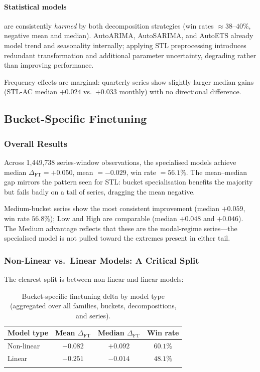 \documentclass[pdflatex,sn-mathphys-num]{sn-jnl}
\theoremstyle{thmstyleone}
\theoremstyle{thmstyletwo}
\theoremstyle{thmstylethree}
\begin{document}
\paragraph{Statistical models} are consistently \emph{harmed} by both
decomposition strategies (win rates $\approx 38$--$40\%$, negative mean and
median).
AutoARIMA, AutoSARIMA, and AutoETS already model trend and seasonality
internally; applying STL preprocessing introduces redundant transformation and
additional parameter uncertainty, degrading rather than improving performance.

Frequency effects are marginal: quarterly series show slightly larger median
gains (STL-AC median $+0.024$ vs.\ $+0.033$ monthly) with no directional
difference.

\subsection{Bucket-Specific Finetuning}\label{sec:ft_results}

\subsubsection{Overall Results}\label{sec:ft_overall}

Across 1{,}449{,}738 series-window observations, the specialised models achieve
median $\Delta_{\mathrm{FT}} = +0.050$, mean $= -0.029$, win rate $= 56.1\%$.
The mean--median gap mirrors the pattern seen for STL: bucket specialisation
benefits the majority but fails badly on a tail of series, dragging the mean
negative.

Medium-bucket series show the most consistent improvement (median $+0.059$,
win rate $56.8\%$); Low and High are comparable (median $+0.048$ and $+0.046$).
The Medium advantage reflects that these are the modal-regime series---the
specialised model is not pulled toward the extremes present in either tail.

\subsubsection{Non-Linear vs.\ Linear Models: A Critical Split}\label{sec:linvnonlin}

The clearest split is between non-linear and linear models:

\begin{table}[ht]
\caption{Bucket-specific finetuning delta by model type (aggregated over all
families, buckets, decompositions, and series).}\label{tab:lin_nonlin}
\begin{tabular}{lccc}
\toprule
Model type & Mean $\Delta_{\mathrm{FT}}$ & Median $\Delta_{\mathrm{FT}}$ & Win rate \\
\midrule
Non-linear & $+0.082$ & $+0.092$ & $60.1\%$ \\
Linear     & $-0.251$ & $-0.014$ & $48.1\%$ \\
\botrule
\end{tabular}
\end{table}
\end{document}
